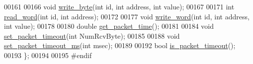 \begin{DoxyCode}
00161     
00166     \textcolor{keywordtype}{void} \hyperlink{a00003_a66c1e32cc45dd46d329f1fc212e46a3d}{write\_byte}(\textcolor{keywordtype}{int} \textcolor{keywordtype}{id}, \textcolor{keywordtype}{int} address, \textcolor{keywordtype}{int} value);
00167     
00171     \textcolor{keywordtype}{int}  \hyperlink{a00003_a45e99341e82c5114f6e829c9141bf96f}{read\_word}(\textcolor{keywordtype}{int} \textcolor{keywordtype}{id}, \textcolor{keywordtype}{int} address);
00172     
00177     \textcolor{keywordtype}{void} \hyperlink{a00003_a925f62ce5e261e5ef4fe6dc46bdc7c63}{write\_word}(\textcolor{keywordtype}{int} \textcolor{keywordtype}{id}, \textcolor{keywordtype}{int} address, \textcolor{keywordtype}{int} value);    
00178     
00180     \textcolor{keywordtype}{double} \hyperlink{a00003_a2fa5375537184c279a9ebfcfc0425071}{get\_packet\_time}();
00181     
00184     \textcolor{keywordtype}{void} \hyperlink{a00003_a067f82c21ed176e18fa224d16f3d1c5b}{set\_packet\_timeout}(\textcolor{keywordtype}{int} NumRcvByte);
00185     
00188     \textcolor{keywordtype}{void} \hyperlink{a00003_a125b42f776c4aac520f274074f68b591}{set\_packet\_timeout\_ms}(\textcolor{keywordtype}{int} msec);
00189     
00192     \textcolor{keywordtype}{bool} \hyperlink{a00003_a00d08481ebc4dee19debecf43f888522}{is\_packet\_timeout}();
00193 \};
00194 
00195 \textcolor{preprocessor}{#endif}
\end{DoxyCode}
